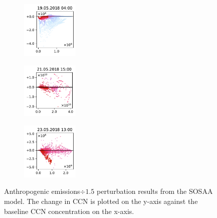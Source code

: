 \begin{figure}[H]
    \begin{subfigure}
        \centering
        \includegraphics[width=0.30\textwidth,valign=t]{evaluation/figures/perturbations/perturbation-19.05.2018:04.00-anthropogenic-div-1.5.pdf}
    \end{subfigure}
    \begin{subfigure}
        \centering
        \includegraphics[width=0.30\textwidth,valign=t]{evaluation/figures/perturbations/perturbation-21.05.2018:15.00-anthropogenic-div-1.5.pdf}
    \end{subfigure}
    \begin{subfigure}
        \centering
        \includegraphics[width=0.30\textwidth,valign=t]{evaluation/figures/perturbations/perturbation-23.05.2018:13.00-anthropogenic-div-1.5.pdf}
    \end{subfigure}

    \caption[Anthropogenic emissions$\div 1.5$ perturbation SOSAA results]{Anthropogenic emissions$\div 1.5$ perturbation results from the SOSAA model. The change in CCN is plotted on the y-axis against the baseline CCN concentration on the x-axis.}
    \label{fig:sosaa-perturbation-anthropogenic-div-1.5}
\end{figure}


